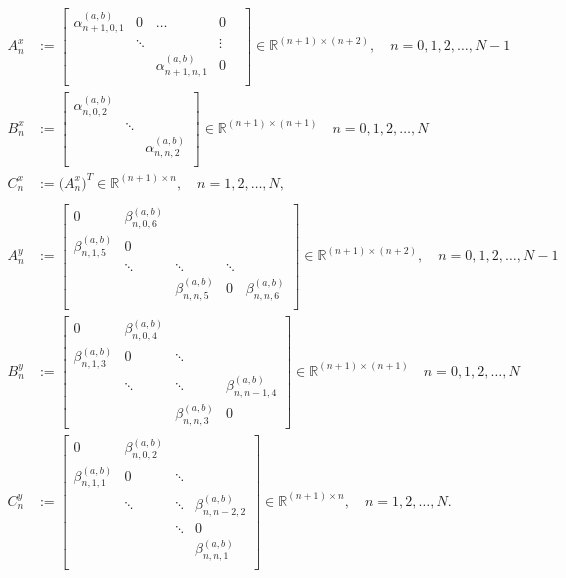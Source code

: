 \documentclass[11pt, oneside]{article}   	%
\newcommand{\R}{\mathbb{R}}
\newcommand{\alphaab}{\alpha^{(a,b)}}
\newcommand{\betaab}{\beta^{(a,b)}}
\begin{document}
\begin{align}
A^x_n &:= \begin{bmatrix}
		\alphaab_{n+1,0,1} & 0 & \hdots & 0 \\
		& \ddots & & \vdots & \\
		& & \alphaab_{n+1,n,1} & 0 \\
	    \end{bmatrix} \in \R^{(n+1)\times(n+2)}, \quad n = 0,1,2,\dots,N-1 \\
B^x_n &:= \begin{bmatrix}
		\alphaab_{n,0,2} & & \\
		& \ddots & \\
		& & \alphaab_{n,n,2} \\
	    \end{bmatrix} \in \R^{(n+1)\times(n+1)} \quad n = 0,1,2,\dots,N \\
C^x_n &:= \big( A^x_n \big)^T \in \R^{(n+1)\times n},  \quad n = 1,2,\dots,N, \\ 
\nonumber \\
A^y_n &:= \begin{bmatrix}
		0 & \betaab_{n,0,6} & & & \\
		\betaab_{n,1,5} & 0 & & & \\
		& \ddots & \ddots & \ddots & \\
		& & \betaab_{n,n,5}& 0 & \betaab_{n,n,6} \\
	    \end{bmatrix} \in \R^{(n+1)\times(n+2)}, \quad n = 0,1,2,\dots,N-1 \\
B^y_n &:= \begin{bmatrix}
		0 & \betaab_{n,0,4} & & \\
		\betaab_{n,1,3} & 0 & \ddots & \\
		& \ddots & \ddots & \betaab_{n,n-1,4} \\
		& & \betaab_{n,n,3} & 0
	    \end{bmatrix} \in \R^{(n+1)\times(n+1)}  \quad n = 0,1,2,\dots,N \\
C^y_n &:= \begin{bmatrix}
		0 & \betaab_{n,0,2} & & \\
		\betaab_{n,1,1} & 0 & \ddots & \\
		& \ddots & \ddots & \betaab_{n,n-2,2} \\
		& & \ddots & 0 \\
		& & & \betaab_{n,n,1} \\
	    \end{bmatrix} \in \R^{(n+1)\times n}, \quad n = 1,2,\dots,N.
\end{align}
\end{document}
